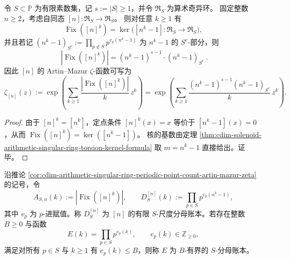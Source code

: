 \begin{corollary}\label{cor:cdim-arithmetic-singular-ring-periodic-point-count-artin-mazur-zeta}
令 \(S\subset\mathbb{P}\) 为有限素数集，记 \(s:=|S|\ge 1\)，并令 \(\mathfrak{R}_S\) 为算术奇异环。
固定整数 \(n\ge 2\)，考虑自同态 \([n]:\mathfrak{R}_S\to\mathfrak{R}_S\)。
则对任意 \(k\ge 1\) 有
\[
\operatorname{Fix}([n]^k)=\ker\bigl([n^k-1]:\mathfrak{R}_S\to \mathfrak{R}_S\bigr),
\]
并且若记
\(
(n^k-1)_{S^c}:=\prod_{p\notin S}p^{v_p(n^k-1)}
\)
为 \(n^k-1\) 的 \(S^c\)-部分，则
\[
\boxed{\;
|\operatorname{Fix}([n]^k)|=(n^k-1)^{s-1}\cdot (n^k-1)_{S^c}\; }.
\]
因此 \([n]\) 的 Artin--Mazur \(\zeta\)-函数可写为
\[
\zeta_{[n]}(z)
:=\exp\!\left(\sum_{k\ge 1}\frac{|\operatorname{Fix}([n]^k)|}{k}\,z^k\right)
=\exp\!\left(\sum_{k\ge 1}\frac{(n^k-1)^{s-1}(n^k-1)_{S^c}}{k}\,z^k\right).
\]
\end{corollary}

\begin{proof}
由于 \([n]^k=[n^k]\)，定点条件 \([n]^k(x)=x\) 等价于 \([n^k-1](x)=0\)，从而
\(
\operatorname{Fix}([n]^k)=\ker([n^k-1])
\)。
核的基数由定理 \ref{thm:cdim-solenoid-arithmetic-singular-ring-torsion-kernel-formula} 取 \(m=n^k-1\) 直接给出。证毕。
\end{proof}
\begin{definition}\label{def:distill-cdim-scaling-denominator-ledger}
沿推论 \ref{cor:cdim-arithmetic-singular-ring-periodic-point-count-artin-mazur-zeta} 的记号，令
\[
A_{S,n}(k):=|\operatorname{Fix}([n]^k)|,
\qquad
D^{[n]}_{S}(k):=\prod_{p\in S}p^{v_p(n^k-1)},
\]
其中 \(v_p\) 为 \(p\)-进赋值。称 \(D^{[n]}_{S}\) 为 \([n]\) 的有限 \(S\)-尺度分母账本。若存在整数 \(B\ge 0\) 与函数
\[
E(k)=\prod_{p\in S}p^{e_p(k)},
\qquad e_p(k)\in\mathbb Z_{\ge0},
\]
满足对所有 \(p\in S\) 与 \(k\ge1\) 有 \(e_p(k)\le B\)，则称 \(E\) 为 \(B\)-有界的 \(S\)-分母账本。
\end{definition}

